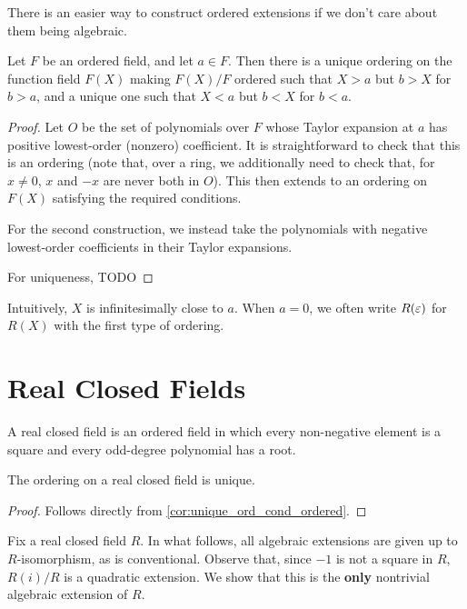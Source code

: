 There is an easier way to construct ordered extensions if we don't care about them being algebraic.

\begin{lemma}
  \label{lem:order_fun_field}
  Let $F$ be an ordered field, and let $a\in F$. Then there is a unique ordering on the function field $F(X)$ making $F(X)/F$ ordered such that $X>a$ but $b>X$ for $b>a$, and a unique one such that $X<a$ but $b<X$ for $b<a$.
\end{lemma}
\begin{proof}
  Let $O$ be the set of polynomials over $F$ whose Taylor expansion at $a$ has positive lowest-order (nonzero) coefficient. It is straightforward to check that this is an ordering (note that, over a ring, we additionally need to check that, for $x\neq0$, $x$ and $-x$ are never both in $O$). This then extends to an ordering on $F(X)$ satisfying the required conditions.

  For the second construction, we instead take the polynomials with negative lowest-order coefficients in their Taylor expansions.

  For uniqueness, TODO
\end{proof}

Intuitively, $X$ is infinitesimally close to $a$. When $a=0$, we often write $R(\varepsilon)$ for $R(X)$ with the first type of ordering.

\section{Real Closed Fields}

\begin{definition}
  \label{def:RCF}
  A real closed field is an ordered field in which every non-negative element is a square and every odd-degree polynomial has a root.
\end{definition}

\begin{lemma}
  \label{lem:RCF_ord_unique}
  The ordering on a real closed field is unique.
\end{lemma}
\begin{proof}
  Follows directly from \ref{cor:unique_ord_cond_ordered}.
\end{proof}

Fix a real closed field $R$. In what follows, all algebraic extensions are given up to $R$-isomorphism, as is conventional. Observe that, since $-1$ is not a square in $R$, $R(i)/R$ is a quadratic extension. We show that this is the \textbf{only} nontrivial algebraic extension of $R$.

